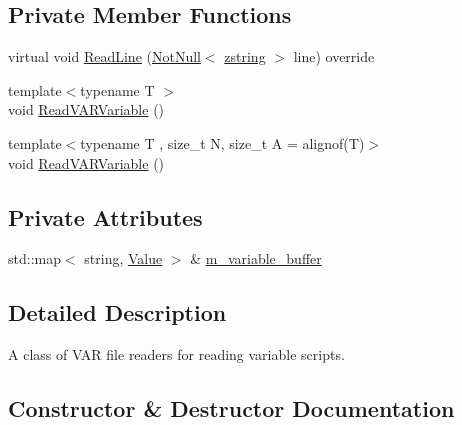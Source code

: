 \subsection*{Private Member Functions}
\begin{DoxyCompactItemize}
\item 
virtual void \mbox{\hyperlink{classmage_1_1loader_1_1_v_a_r_reader_a511a0778cc515aece781bfdb76024cea}{Read\+Line}} (\mbox{\hyperlink{namespacemage_a8769f9d670d6b585ea306cb1062af94b}{Not\+Null}}$<$ \mbox{\hyperlink{namespacemage_a4163ec9a9a27d5e7f4b452dcb99cb2b9}{zstring}} $>$ line) override
\item 
{\footnotesize template$<$typename T $>$ }\\void \mbox{\hyperlink{classmage_1_1loader_1_1_v_a_r_reader_a253cd885c8527453feedfe619fb684e1}{Read\+V\+A\+R\+Variable}} ()
\item 
{\footnotesize template$<$typename T , size\+\_\+t N, size\+\_\+t A = alignof(\+T)$>$ }\\void \mbox{\hyperlink{classmage_1_1loader_1_1_v_a_r_reader_aa27db2b3ba9c66dbdd2c75c6aba1848c}{Read\+V\+A\+R\+Variable}} ()
\end{DoxyCompactItemize}
\subsection*{Private Attributes}
\begin{DoxyCompactItemize}
\item 
std\+::map$<$ string, \mbox{\hyperlink{namespacemage_a5bc219b33037a43e23f59e4e8ddff10d}{Value}} $>$ \& \mbox{\hyperlink{classmage_1_1loader_1_1_v_a_r_reader_a71291d47ea9f9d679bfd7584447ae6bb}{m\+\_\+variable\+\_\+buffer}}
\end{DoxyCompactItemize}


\subsection{Detailed Description}
A class of V\+AR file readers for reading variable scripts. 

\subsection{Constructor \& Destructor Documentation}
\mbox{\label{classmage_1_1loader_1_1_v_a_r_reader_ae06b2b97d9a0ce16047b0c8cfcd4a73f}} 
